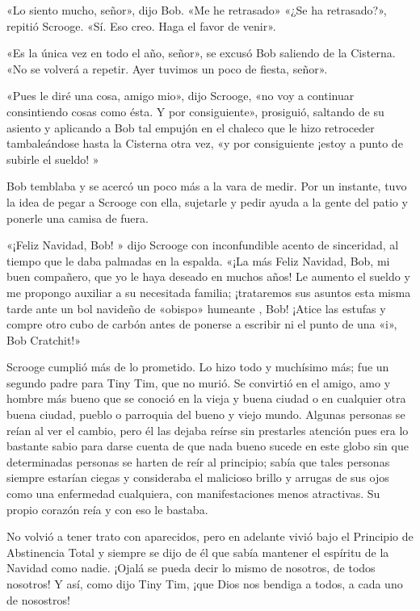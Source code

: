 \documentclass{novela}
\begin{document}
 «Lo siento mucho, señor», dijo Bob. «Me he retrasado» «¿Se ha retrasado?», repitió Scrooge. «Sí. Eso creo. Haga el favor de venir».

 «Es la única vez en todo el año, señor», se excusó Bob saliendo de la Cisterna. «No se volverá a repetir. Ayer tuvimos un poco de fiesta, señor».

 «Pues le diré una cosa, amigo mio», dijo Scrooge, «no voy a continuar consintiendo cosas como ésta. Y por consiguiente», prosiguió, saltando de su asiento y aplicando a Bob tal empujón en el chaleco que le hizo retroceder tambaleándose hasta la Cisterna otra vez, «y por consiguiente ¡estoy a punto de subirle el sueldo! »

 Bob temblaba y se acercó un poco más a la vara de medir. Por un instante, tuvo la idea de pegar a Scrooge con ella, sujetarle y pedir ayuda a la gente del patio y ponerle una camisa de fuera.

 «¡Feliz Navidad, Bob! » dijo Scrooge con inconfundible acento de sinceridad, al tiempo que le daba palmadas en la espalda. «¡La más Feliz Navidad, Bob, mi buen compañero, que yo le haya deseado en muchos años! Le aumento el sueldo y me propongo auxiliar a su necesitada familia; ¡trataremos sus asuntos esta misma tarde ante un bol navideño de «obispo» humeante , Bob! ¡Atice las estufas y compre otro cubo de carbón antes de ponerse a escribir ni el punto de una «i», Bob Cratchit!»

 Scrooge cumplió más de lo prometido. Lo hizo todo y muchísimo más; fue un segundo padre para Tiny Tim, que no murió. Se convirtió en el amigo, amo y hombre más bueno que se conoció en la vieja y buena ciudad o en cualquier otra buena ciudad, pueblo o parroquia del bueno y viejo mundo. Algunas personas se reían al ver el cambio, pero él las dejaba reírse sin prestarles atención pues era lo bastante sabio para darse cuenta de que nada bueno sucede en este globo sin que determinadas personas se harten de reír al principio; sabía que tales personas siempre estarían ciegas y consideraba el malicioso brillo y arrugas de sus ojos como una enfermedad cualquiera, con manifestaciones menos atractivas. Su propio corazón reía y con eso le bastaba.

 No volvió a tener trato con aparecidos, pero en adelante vivió bajo el Principio de Abstinencia Total y siempre se dijo de él que sabía mantener el espíritu de la Navidad como nadie. ¡Ojalá se pueda decir lo mismo de nosotros, de todos nosotros! Y así, como dijo Tiny Tim, ¡que Dios nos bendiga a todos, a cada uno de nosostros!




 \Fin
\end{document}
